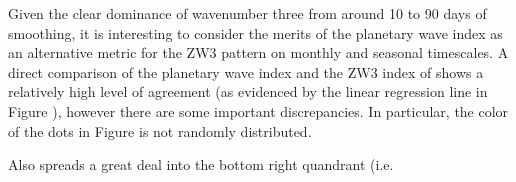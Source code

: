 Given the clear dominance of wavenumber three from around 10 to 90 days of smoothing, it is interesting to consider the merits of the planetary wave index as an alternative metric for the ZW3 pattern on monthly and seasonal timescales. A direct comparison of the planetary wave index and the ZW3 index of \citet{Raphael2004} shows a relatively high level of agreement (as evidenced by the linear regression line in Figure \label{fig:metric_vs_zw3}), however there are some important discrepancies. In particular, the color of the dots in Figure \label{fig:metric_vs_zw3} is not randomly distributed.

Also spreads a great deal into the bottom right quandrant (i.e.  


